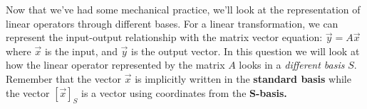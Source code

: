\begin{enumerate}

  \end{enumerate}

  Now that we've had some mechanical practice, we'll look at the representation of linear operators through different bases. 
  For a linear transformation, we can represent the input-output relationship with the matrix vector equation:
  $\vec{y} = A \vec{x}$ where $\vec{x}$ is the input, and $\vec{y}$ is the output vector.
  In this question we will look at how the linear operator represented by the matrix $A$ looks in a \textit{different basis} $S.$
  Remember that the vector $\vec{x}$ is implicitly written in the \textbf{standard basis} while the vector $[\vec{x}]_S$ is a vector using coordinates from the \textbf{S-basis.}

